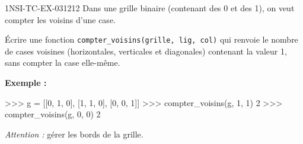 \begin{exercice}{1NSI-TC-EX-031}{2}{12}
Dans une grille binaire (contenant des 0 et des 1), on veut compter les voisins
d'une case.

Écrire une fonction \lstinline{compter_voisins(grille, lig, col)} qui renvoie le
nombre de cases voisines (horizontales, verticales et diagonales) contenant la
valeur 1, sans compter la case elle-même.

\textbf{Exemple :}
\begin{console}
>>> g = [[0, 1, 0], [1, 1, 0], [0, 0, 1]]
>>> compter_voisins(g, 1, 1)
2
>>> compter_voisins(g, 0, 0)
2
\end{console}

\textit{Attention :} gérer les bords de la grille.
\end{exercice}
